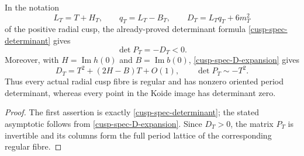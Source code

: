 \begin{corollary}
\label{koide-s6-cor-actual-cusp}
In the notation
\[
 L_T=T+H_T,\qquad q_T=L_T-B_T,\qquad
 D_T=L_Tq_T+6m_T^2
\]
of the positive radial cusp, the already-proved determinant formula
\cref{cusp-spec-determinant} gives
\begin{equation}
 \det P_T=-D_T<0.
 \label{koide-s6-eq-actual-cusp-determinant}
\end{equation}
Moreover, with
\(H=\operatorname{Im}h(0)\) and \(B=\operatorname{Im}b(0)\),
\cref{cusp-spec-D-expansion} gives
\begin{equation}
 D_T=T^2+(2H-B)T+O(1),
 \qquad
 \det P_T\sim-T^2.
 \label{koide-s6-eq-actual-cusp-asymptotic}
\end{equation}
Thus every actual radial cusp fibre is regular and has nonzero oriented
period determinant, whereas every point in the Koide image has determinant
zero.
\end{corollary}

\begin{proof}
The first assertion is exactly \cref{cusp-spec-determinant}; the stated
asymptotic follows from \cref{cusp-spec-D-expansion}.  Since \(D_T>0\), the
matrix \(P_T\) is invertible and its columns form the full period lattice of
the corresponding regular fibre.
\end{proof}
